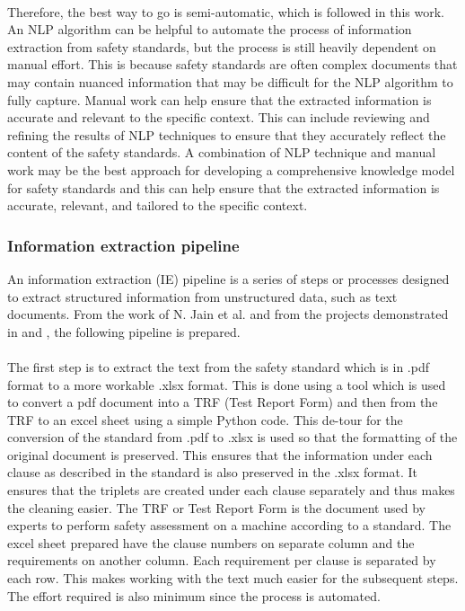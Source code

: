 \paragraph{} Therefore, the best way to go is semi-automatic, which is followed in this work. An NLP algorithm can be helpful to automate the process of information extraction from safety standards, but the process is still heavily dependent on manual effort. This is because safety standards are often complex documents that may contain nuanced information that may be difficult for the NLP algorithm to fully capture. Manual work can help ensure that the extracted information is accurate and relevant to the specific context. This can include reviewing and refining the results of NLP techniques to ensure that they accurately reflect the content of the safety standards. A combination of NLP technique and manual work may be the best approach for developing a comprehensive knowledge model for safety standards and this can help ensure that the extracted information is accurate, relevant, and tailored to the specific context.

\subsubsection{Information extraction pipeline}
An information extraction (IE) pipeline is a series of steps or processes designed to extract structured information from unstructured data, such as text documents. From the work of N. Jain et al. \cite{text2kg} and from the projects demonstrated in \cite{analyticsvidhya} and \cite{medium}, the following pipeline is prepared.


\bigskip {}

\paragraph{} The first step is to extract the text from the safety standard which is in .pdf format to a more workable .xlsx format. This is done using a tool which is used to convert a pdf document into a TRF (Test Report Form) and then from the TRF to an excel sheet using a simple Python code. This de-tour for the conversion of the standard from .pdf to .xlsx is used so that the formatting of the original document is preserved. This ensures that the information under each clause as described in the standard is also preserved in the .xlsx format. It ensures that the triplets are created under each clause separately and thus makes the cleaning easier. The TRF or Test Report Form is the document used by experts to perform safety assessment on a machine according to a standard. The excel sheet prepared have the clause numbers on separate column and the requirements on another column. Each requirement per clause is separated by each row. This makes working with the text much easier for the subsequent steps. The effort required is also minimum since the process is automated. 


